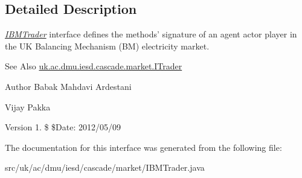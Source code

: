 \subsection{Detailed Description}
{\itshape \hyperlink{interfaceuk_1_1ac_1_1dmu_1_1iesd_1_1cascade_1_1market_1_1_i_b_m_trader}{I\-B\-M\-Trader}} interface defines the methods' signature of an agent actor player in the U\-K Balancing Mechanism (B\-M) electricity market. 

\begin{DoxySeeAlso}{See Also}
\hyperlink{interfaceuk_1_1ac_1_1dmu_1_1iesd_1_1cascade_1_1market_1_1_i_trader}{uk.\-ac.\-dmu.\-iesd.\-cascade.\-market.\-I\-Trader}
\end{DoxySeeAlso}
\begin{DoxyAuthor}{Author}
Babak Mahdavi Ardestani 

Vijay Pakka 
\end{DoxyAuthor}
\begin{DoxyVersion}{Version}
1. \$ \$\-Date\-: 2012/05/09 
\end{DoxyVersion}


The documentation for this interface was generated from the following file\-:\begin{DoxyCompactItemize}
\item 
src/uk/ac/dmu/iesd/cascade/market/I\-B\-M\-Trader.\-java\end{DoxyCompactItemize}
